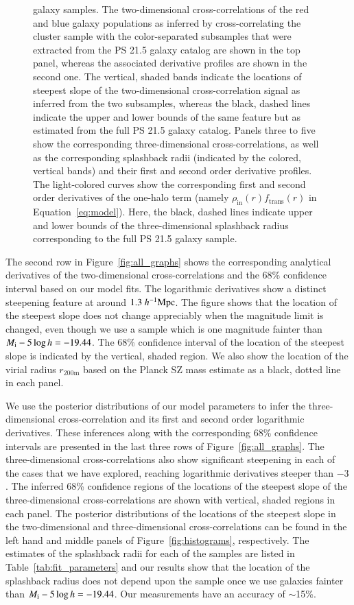 \documentclass[iop, apjl, twocolappendix, numberedappendix]{emulateapj}
\def\mpch{h^{-1}{\rm Mpc}}
\begin{document}
\begin{figure}
{galaxy samples. The two-dimensional cross-correlations
of the red and blue galaxy populations as inferred by
cross-correlating the cluster sample with the color-separated
subsamples that were extracted from the PS 21.5 galaxy catalog are
shown in the top panel, whereas the associated derivative profiles
are shown in the second one. The vertical, shaded bands indicate the
locations of steepest slope of the two-dimensional cross-correlation signal
as inferred from the two subsamples, whereas the black, dashed lines
indicate the upper and lower bounds of the same feature but as
estimated from the full PS 21.5 galaxy catalog.
Panels three to five show the corresponding three-dimensional
cross-correlations, as well as the corresponding
splashback radii (indicated by the colored, vertical bands) and
their first and second order derivative profiles. The light-colored
curves show the corresponding first and second order derivatives of the one-halo
term (namely $\rho_{\mathrm{in}}(r)f_{\mathrm{trans}}(r)$ in Equation~\ref{eq:model}). Here, the black, dashed lines indicate upper and lower bounds of the
three-dimensional splashback radius corresponding to the full PS 21.5 galaxy sample.}
   \label{fig:color_curve_all}
\end{figure}

The second row in Figure~\ref{fig:all_graphs} shows the
corresponding analytical derivatives of the two-dimensional
cross-correlations and the 68\% confidence interval based on our
model fits. The logarithmic derivatives show a distinct steepening
feature at around $1.3~\mpch$. The figure shows that the
location of the steepest slope does not change appreciably when the
magnitude limit is changed, even though we use a sample which is one
magnitude fainter than $M_{\rm i}-5\log h=-19.44$. The 68\%
confidence interval of the location of the steepest slope is
indicated by the vertical, shaded region. We also show the location
of the virial radius $r_{\mathrm{200m}}$ based on the Planck SZ mass estimate
as a black, dotted line in each panel.

We use the posterior distributions of our model parameters to infer
the three-dimensional cross-correlation and its first and second order logarithmic
derivatives. These inferences along with the corresponding 68\%
confidence intervals are presented in the last three rows of
Figure~\ref{fig:all_graphs}. The three-dimensional cross-correlations
also show significant steepening in each of the cases that we have
explored, reaching logarithmic derivatives steeper than $-3$. The
inferred 68\% confidence regions of the locations of the steepest
slope of the three-dimensional cross-correlations are shown with
vertical, shaded regions in each panel. The posterior
distributions of the locations of the steepest slope in the
two-dimensional and three-dimensional cross-correlations can be
found in the left hand and middle panels of
Figure~\ref{fig:histograms}, respectively. The estimates of the splashback radii
for each of the samples are listed in Table~\ref{tab:fit_parameters}
and our results show that the location of the splashback radius does
not depend upon the sample once we use galaxies fainter than $M_{\rm
i}-5\log h=-19.44$. Our measurements have an accuracy of $\sim$15\%.
\end{document}
